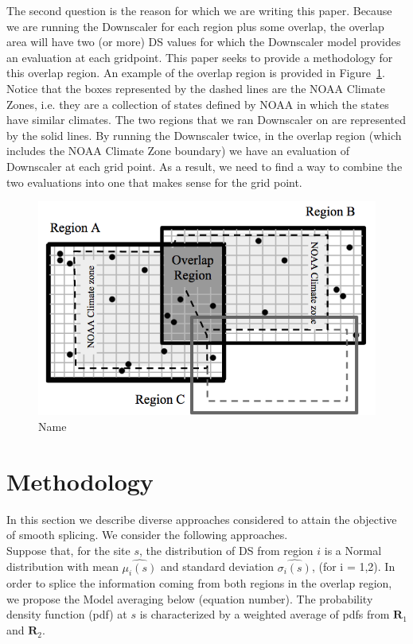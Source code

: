 \documentclass[10pt]{article}
\theoremstyle{plain}
\theoremstyle{definition}
\theoremstyle{remark}
\begin{document}
\justify
The second question is the reason for which we are writing this paper.  Because we are running the Downscaler for each region plus some overlap, the overlap area will have two (or more) DS values for which the Downscaler model provides an evaluation at each gridpoint.  This paper seeks to provide a methodology for this overlap region.  An example of the overlap region is provided in Figure~\ref{fig:overlap}.  Notice that the boxes represented by the dashed lines are the NOAA Climate Zones, i.e. they are a collection of states defined by NOAA in which the states have similar climates.  The two regions that we ran Downscaler on are represented by the solid lines.  By running the Downscaler twice, in the overlap region (which includes the NOAA Climate Zone boundary) we have an evaluation of Downscaler at each grid point.  As a result, we need to find a way to combine the two evaluations into one that makes sense for the grid point.

\begin{figure}
	\centering
	\vspace{-1em}
	\includegraphics[width=0.7\linewidth]{overlap}
	\caption{Name}
	\label{fig:overlap}
\end{figure}


\section{Methodology}
In this section we describe diverse approaches considered to attain the objective of smooth splicing. We consider the following approaches.\\
Suppose that, for the site $s$, the distribution of DS from region $i$ is a Normal distribution with mean $\hat{\mu_{i}(s)}$ and standard deviation $\hat{\sigma_{i}(s)}$, (for i = 1,2).
\justify
In order to splice the information coming from both regions in the overlap region, we propose the Model averaging below (equation number). The probability density function (pdf) at $s$ is characterized by a weighted average of pdfs from $\bm{R}_{1}$ and $\bm{R}_{2}$. 
\end{document}
